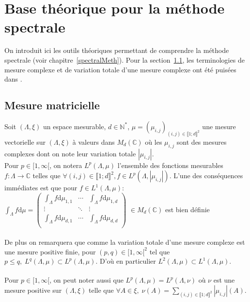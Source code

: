 \appendix

\chapter{Base théorique pour la méthode spectrale}
\label{annexeA}
On introduit ici les outils théoriques permettant de comprendre la méthode
spectrale (voir chapitre~\ref{spectralMeth}). Pour la section~\ref{kloppi}, les terminologies de mesure complexe et de variation totale d'une mesure complexe ont
été puisées dans \cite{kloppCours}.



\section{Mesure matricielle}
\label{kloppi}
Soit $(\Lambda, \xi)$ un espace mesurable, $d \in \mathbb{N^*}$, $\mu = (\mu_{i,j})_{(i,j) \in \llbracket 1; d \rrbracket^2}$ une mesure vectorielle sur $(\Lambda, \xi)$ à valeurs dans $M_d(\mathbb{C})$ où les $\mu_{i,j}$ sont des mesures complexes dont on note leur variation totale $| \mu_{i,j} |$. \\

Pour $p \in [1, \infty[ $, on notera $L^{p}(\Lambda, \mu)$ l'ensemble des fonctions mesurables $f: \Lambda \rightarrow \mathbb{C}$ telles que $\forall (i,j) \in \llbracket 1; d \rrbracket^2, f \in L^{p}(\Lambda, |\mu_{i,j}|)$. 
L'une des conséquences immédiates est que pour $f \in L^{1}(\Lambda, \mu)$:\\

$\int_{\Lambda} f \mathrm{d}\mu = 
                                    \begin{pmatrix}
                                      \int_{\Lambda} f \mathrm{d}\mu_{1,1} & \cdots & \int_{\Lambda} f \mathrm{d}\mu_{1,d} \\
                                      \vdots &\ddots & \vdots \\
                                      \int_{\Lambda} f \mathrm{d}\mu_{d,1} & \cdots & \int_{\Lambda} f \mathrm{d}\mu_{d,d} \\
                                     \end{pmatrix}$  $\in M_d(\mathbb{C})$ est bien définie\\
         
         
~\\         
De plus on remarquera que comme la variation totale d'une mesure complexe est une mesure positive finie, pour $ (p,q) \in [1, \infty[^2 $ tel que $p \leq q, \;L^{q}(\Lambda, \mu) \subset L^{p}(\Lambda, \mu)$. D'où en particulier $L^{2}(\Lambda, \mu) \subset L^{1}(\Lambda, \mu)$.\\
~\\
Pour $p \in [1, \infty[ $, on peut noter aussi que $L^{p}(\Lambda, \mu) = L^{p}(\Lambda, \nu)$ où $\nu$ est une mesure positive sur $(\Lambda, \xi)$ telle que $\forall A \in \xi, \; \nu(A) = \displaystyle\sum_{(i,j) \in \llbracket 1;d \rrbracket^2} |\mu_{i,j}|(A) $. \\

